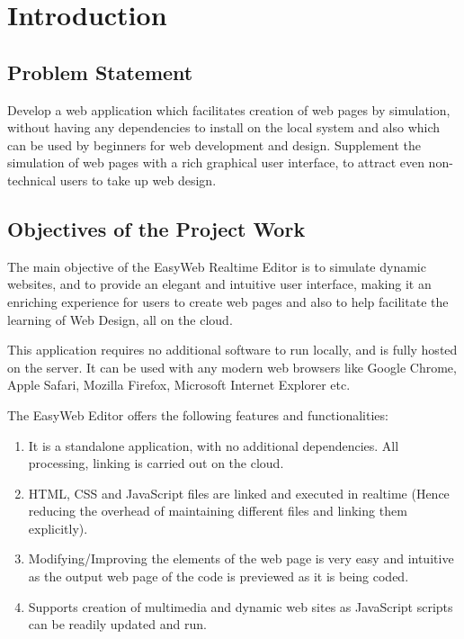 \documentclass[12pt,a4paper]{article}
\begin{document}
\newpage
\tableofcontents
\thispagestyle{empty}

\newpage
{}
\setcounter{page}{1}

\section{Introduction}
\subsection{Problem Statement}
Develop a web application which facilitates creation of web pages by simulation, without having any dependencies to install on the local system and also which can be used by beginners for web development and design. Supplement the simulation of web pages with a rich graphical user interface, to attract even non-technical users to take up web design.

\subsection{Objectives of the Project Work}
The main objective of the EasyWeb Realtime Editor is to simulate dynamic websites, and to provide an elegant and intuitive user interface, making it an enriching experience for users to create web pages and also to help facilitate the learning of Web Design, all on the cloud.\cite{cloud}

This application requires no additional software to run locally, and is fully hosted on the server. It can be used with any modern web browsers like Google Chrome, Apple Safari,
Mozilla Firefox, Microsoft Internet Explorer etc.

The EasyWeb Editor offers the following features and functionalities:
\begin{enumerate}
	\item It is a standalone application, with no additional dependencies. All processing, linking is carried out on the cloud.
	\item HTML, CSS and JavaScript files are linked and executed in realtime (Hence reducing the overhead of maintaining different files and linking them explicitly).
	\item Modifying/Improving the elements of the web page is very easy and intuitive as the output web page of the code is previewed as it is being coded.
	\item Supports creation of multimedia and dynamic web sites as JavaScript scripts can be readily updated and run.
\end{enumerate}
\end{document}
